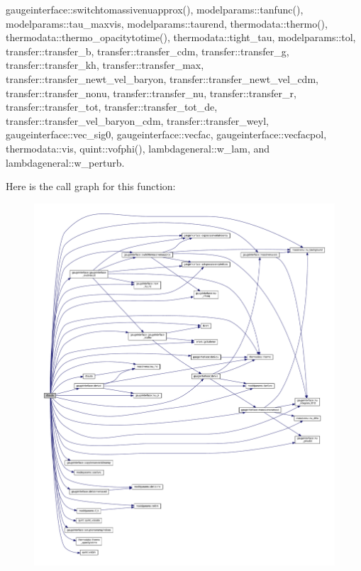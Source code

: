 gaugeinterface\+::switchtomassivenuapprox(), modelparams\+::tanfunc(), modelparams\+::tau\+\_\+maxvis, modelparams\+::taurend, thermodata\+::thermo(), thermodata\+::thermo\+\_\+opacitytotime(), thermodata\+::tight\+\_\+tau, modelparams\+::tol, transfer\+::transfer\+\_\+b, transfer\+::transfer\+\_\+cdm, transfer\+::transfer\+\_\+g, transfer\+::transfer\+\_\+kh, transfer\+::transfer\+\_\+max, transfer\+::transfer\+\_\+newt\+\_\+vel\+\_\+baryon, transfer\+::transfer\+\_\+newt\+\_\+vel\+\_\+cdm, transfer\+::transfer\+\_\+nonu, transfer\+::transfer\+\_\+nu, transfer\+::transfer\+\_\+r, transfer\+::transfer\+\_\+tot, transfer\+::transfer\+\_\+tot\+\_\+de, transfer\+::transfer\+\_\+vel\+\_\+baryon\+\_\+cdm, transfer\+::transfer\+\_\+weyl, gaugeinterface\+::vec\+\_\+sig0, gaugeinterface\+::vecfac, gaugeinterface\+::vecfacpol, thermodata\+::vis, quint\+::vofphi(), lambdageneral\+::w\+\_\+lam, and lambdageneral\+::w\+\_\+perturb.

Here is the call graph for this function\+:
\nopagebreak
\begin{figure}[H]
\begin{center}
\leavevmode
\includegraphics[width=350pt]{equations__bde__v3__original_8f90_a1c228811398a4401bb57d778911a13df_cgraph}
\end{center}
\end{figure}
\mbox{\label{equations__bde__v3__original_8f90_a2c95a3b42a68aa87a21097ce3ff8bbe6}} 

